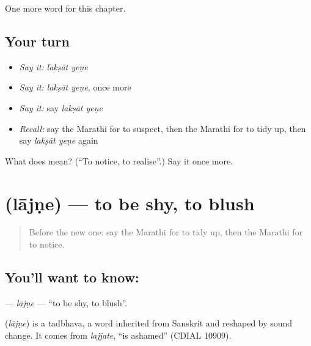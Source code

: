 \begin{grammarlens}[title={What you've built}]
One more word for this chapter.
\end{grammarlens}

\subsection*{Your turn}
\begin{itemize}
\raggedright
  \item \emph{Say it:} \emph{lakṣāt yeṇe}
  \item \emph{Say it:} \emph{lakṣāt yeṇe}, once more
  \item \emph{Say it:} say \emph{lakṣāt yeṇe}
  \item \emph{Recall:} say the Marathi for to suspect, then the Marathi for to tidy up, then say \emph{lakṣāt yeṇe} again
\end{itemize}

\begin{tcolorbox}[breakable,colback=teal!4,colframe=teal!35!black,title={Before you move on}]
What does   mean? (\textquotedblleft{}To notice, to realise\textquotedblright{}.) Say it once more.
\end{tcolorbox}
\section[\texorpdfstring{\mr{लाजणे} (lājṇe)}{लाजणे (lājṇe)}]{ (lājṇe) — to be shy, to blush}

\label{lesson:MR-C168-lajne}



\begin{quote}
Before the new one: say the Marathi for to tidy up, then the Marathi for to notice.
\end{quote}

\subsection*{You'll want to know: }
\textbf{} — \emph{lājṇe} — \textquotedblleft{}to be shy, to blush\textquotedblright{}.

\begin{cousinweb}
\textbf{} (\emph{lājṇe}) is a tadbhava, a word inherited from Sanskrit and reshaped by sound change. It comes from \emph{lajjate}, \textquotedblleft{}is ashamed\textquotedblright{} (CDIAL 10909).
\end{cousinweb}

